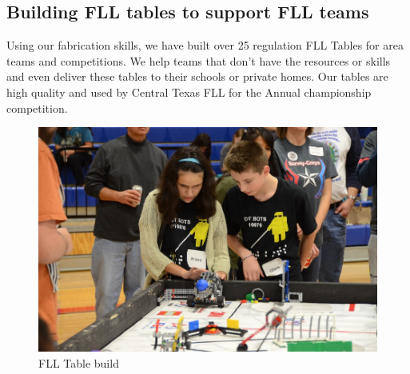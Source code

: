 \subsection{Building FLL tables to support FLL teams}
Using our fabrication skills, we have built over 25 regulation FLL Tables for area teams and competitions.   We help teams that don’t have the resources or skills and even deliver these tables to their schools or private homes.  Our tables are high quality and used by Central Texas FLL for the Annual championship competition.
\begin{figure}[H]
	\centering
	\includegraphics[height=0.8\linewidth]{tables}
	\caption[]{FLL Table build}
	\label{fig:tables}
\end{figure}

